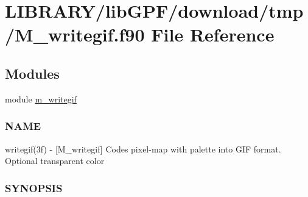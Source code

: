 \hypertarget{M__writegif_8f90}{}\section{L\+I\+B\+R\+A\+R\+Y/lib\+G\+P\+F/download/tmp/\+M\+\_\+writegif.f90 File Reference}
\label{M__writegif_8f90}
\subsection*{Modules}
\begin{DoxyCompactItemize}
\item 
module \hyperlink{namespacem__writegif}{m\+\_\+writegif}
\begin{DoxyCompactList}\small\item\em \subsubsection*{N\+A\+ME}

writegif(3f) -\/ \mbox{[}M\+\_\+writegif\mbox{]} Codes pixel-\/map with palette into G\+IF format. Optional transparent color \subsubsection*{S\+Y\+N\+O\+P\+S\+IS}\end{DoxyCompactList}\end{DoxyCompactItemize}
